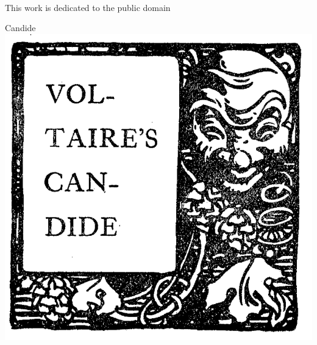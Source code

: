 \documentclass[a5paper,openany,11pt]{memoir}
\begin{document}
\\
This work is dedicated to the public domain
\frontmatter
\begin{KeepFromToc}
\tableofcontents
\end{KeepFromToc}

\clearpage
\vspace*{4cm}
\thispagestyle{empty}
\begin{center}
\huge Candide \\
\vspace*{2cm}
\includegraphics[scale=0.2]{002.jpg}	
\end{center}
\newpage
\mainmatter






























\newpage
\thispagestyle{empty}
\phantom{empty}
\newpage
\thispagestyle{empty}
\phantom{empty}
\end{document}

